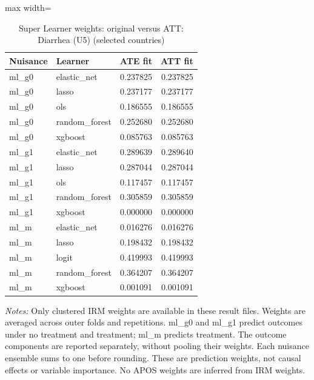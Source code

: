\begin{table}[htbp]
\centering\scriptsize
\caption{Super Learner weights: original versus ATT: Diarrhea (U5) (selected countries)}
\label{tab:table-ate-att-convex-weights-diarrhea-selected-countries}
\begin{adjustbox}{max width=\linewidth}
\begin{tabular}{llrr}
\toprule
Nuisance & Learner & ATE fit & ATT fit \\
\midrule
ml\_g0 & elastic\_net & 0.237825 & 0.237825 \\
ml\_g0 & lasso & 0.237177 & 0.237177 \\
ml\_g0 & ols & 0.186555 & 0.186555 \\
ml\_g0 & random\_forest & 0.252680 & 0.252680 \\
ml\_g0 & xgboost & 0.085763 & 0.085763 \\
ml\_g1 & elastic\_net & 0.289639 & 0.289640 \\
ml\_g1 & lasso & 0.287044 & 0.287044 \\
ml\_g1 & ols & 0.117457 & 0.117457 \\
ml\_g1 & random\_forest & 0.305859 & 0.305859 \\
ml\_g1 & xgboost & 0.000000 & 0.000000 \\
ml\_m & elastic\_net & 0.016276 & 0.016276 \\
ml\_m & lasso & 0.198432 & 0.198432 \\
ml\_m & logit & 0.419993 & 0.419993 \\
ml\_m & random\_forest & 0.364207 & 0.364207 \\
ml\_m & xgboost & 0.001091 & 0.001091 \\
\bottomrule
\end{tabular}
\end{adjustbox}
\par\vspace{3pt}\begin{minipage}{\linewidth}\scriptsize\textit{Notes:} Only clustered IRM weights are available in these result files. Weights are averaged across outer folds and repetitions. ml\_g0 and ml\_g1 predict outcomes under no treatment and treatment; ml\_m predicts treatment. The outcome components are reported separately, without pooling their weights. Each nuisance ensemble sums to one before rounding. These are prediction weights, not causal effects or variable importance. No APOS weights are inferred from IRM weights.\end{minipage}
\end{table}
